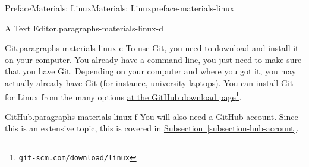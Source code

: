 \documentclass[oneside,10pt,]{book}
\newcommand{\xreffont}{\relax}
\begin{document}
\begin{preface}{Preface}{Materials: Linux}{}{Materials: Linux}{}{}{preface-materials-linux}
\begin{paragraphs}{A Text Editor.}{paragraphs-materials-linux-d}
\end{paragraphs}%
\begin{paragraphs}{Git.}{paragraphs-materials-linux-e}%
To use Git, you need to download and install it on your computer. You already have a command line, you just need to make sure that you have Git. Depending on your computer and where you got it, you may actually already have Git (for instance, university laptops). You can install Git for Linux from the many options \href{https://git-scm.com/download/linux}{at the GitHub download page}\footnote{\nolinkurl{git-scm.com/download/linux}\label{fn-materials-linux-e-b-b}}.%
\end{paragraphs}%
\begin{paragraphs}{GitHub.}{paragraphs-materials-linux-f}%
You will also need a GitHub account. Since this is an extensive topic, this is covered in \hyperref[subsection-hub-account]{Subsection~{\xreffont\ref{subsection-hub-account}}}.%
\end{paragraphs}%
\end{preface}
\setcounter{tocdepth}{0}
\renewcommand*\contentsname{Contents}
\tableofcontents
\mainmatter
%
%
\typeout{************************************************}
\typeout{************************************************}
%
\end{document}
